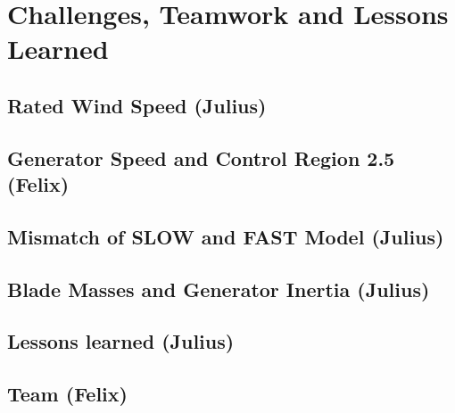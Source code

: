 \chapter{Challenges, Teamwork and Lessons Learned}
\section{Rated Wind Speed (Julius)} \label{RatedWindSpeed}


\section{Generator Speed and Control Region 2.5 (Felix)} \label{Region2d5}


\section{Mismatch of SLOW and FAST Model (Julius)}


\section{Blade Masses and Generator Inertia (Julius)}


\section{Lessons learned (Julius)}


\section{Team (Felix)}



